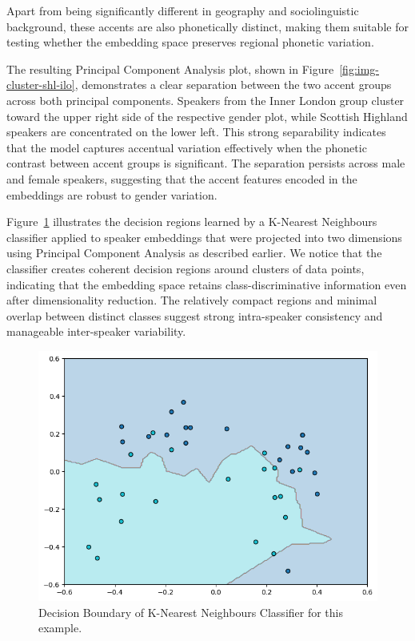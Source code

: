 \documentclass[conference]{IEEEtran}
\begin{document}
	Apart from being significantly different in geography and sociolinguistic background, these accents are also phonetically distinct, making them suitable for testing whether the embedding space preserves regional phonetic variation.
	
	The resulting Principal Component Analysis plot, shown in Figure~\ref{fig:img-cluster-shl-ilo}, demonstrates a clear separation between the two accent groups across both principal components. Speakers from the Inner London group cluster toward the upper right side of the respective gender plot, while Scottish Highland speakers are concentrated on the lower left. This strong separability indicates that the model captures accentual variation effectively when the phonetic contrast between accent groups is significant. The separation persists across male and female speakers, suggesting that the accent features encoded in the embeddings are robust to gender variation.
	
	Figure~\ref{fig:knn-shl-ilo} illustrates the decision regions learned by a K-Nearest Neighbours classifier applied to speaker embeddings that were projected into two dimensions using Principal Component Analysis as described earlier. We notice that the classifier creates coherent decision regions around clusters of data points, indicating that the embedding space retains class-discriminative information even after dimensionality reduction. The relatively compact regions and minimal overlap between distinct classes suggest strong intra-speaker consistency and manageable inter-speaker variability.
	
	\begin{figure}[H]
		\centering
		\includegraphics[width=0.7\linewidth]{img/img-knn-shl-ilo.png}
		\caption{Decision Boundary of K-Nearest Neighbours Classifier for this example.}
		\label{fig:knn-shl-ilo}
	\end{figure}
	
\end{document}
